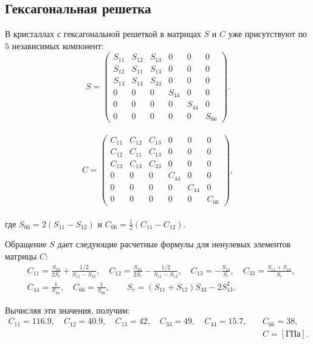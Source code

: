 \documentclass[12pt,a4paper]{article}
\begin{document}
\subsection{Гексагональная решетка}

В кристаллах с гексагональной решеткой в матрицах $S$ и $C$ уже присутствуют по $5$ независимых компонент:
\[
    S=
    \begin{pmatrix}
    S_{11} & S_{12} & S_{13} & 0 & 0 & 0\\
    S_{12} & S_{11} & S_{13} & 0 & 0 & 0\\
    S_{13} & S_{13} & S_{33} & 0 & 0 & 0\\
    0 & 0 & 0 & S_{44} & 0 & 0\\
    0 & 0 & 0 & 0 & S_{44} & 0\\
    0 & 0 & 0 & 0 & 0 & S_{66} 
    \end{pmatrix}.
\]
\\
\[
    C=
    \begin{pmatrix}
    C_{11} & C_{12} & C_{13} & 0 & 0 & 0\\
    C_{12} & C_{11} & C_{13} & 0 & 0 & 0\\
    C_{13} & C_{13} & C_{33} & 0 & 0 & 0\\
    0 & 0 & 0 & C_{44} & 0 & 0\\
    0 & 0 & 0 & 0 & C_{44} & 0\\
    0 & 0 & 0 & 0 & 0 & C_{66} 
    \end{pmatrix},
\]
\\
\noindent где $S_{66}=2(S_{11}-S_{12})$ и $C_{66}=\frac{1}{2}(C_{11}-C_{12})$. 

Обращение $S$ дает следующие расчетные формулы для ненулевых элементов матрицы $C\colon$
\[
    \begin{split}
        &C_{11}=\frac{S_{33}}{2 S_r}+\frac{1/2}{S_{11}-S_{12}}, \quad C_{12}=\frac{S_{33}}{2 S_r}-\frac{1/2}{S_{11}-S_{12}}, \quad C_{13}=-\frac{S_{13}}{S_r}, \quad  C_{33}=\frac{S_{11}+S_{12}}{S_r}, 
        \\[0.7em]
        &C_{44}=\frac{1}{S_{44}}, \quad C_{66}=\frac{1}{S_{66}}, \qquad S_r=(S_{11}+S_{12})S_{33}-2S_{13}^2.  
    \end{split}
\]

Вычисляя эти значения, получим:
\[
    \begin{split}
    C_{11} = 116.9, \quad C_{12} = 40.9, \quad C_{13}= 42, \quad C_{33} = 49, \quad C_{44} = 15.7, \quad &C_{66} = 38,
    \\
    & C = [\text{ГПа}].
    \end{split}
\]
\end{document}
